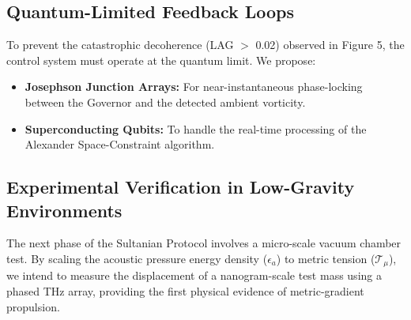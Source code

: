 \documentclass[11pt,a4paper]{article}
\begin{document}
\subsection{Quantum-Limited Feedback Loops}
To prevent the catastrophic decoherence (LAG $>$ 0.02) observed in Figure 5, the control system must operate at the quantum limit. We propose:
\begin{itemize}
    \item \textbf{Josephson Junction Arrays:} For near-instantaneous phase-locking between the Governor and the detected ambient vorticity.
    \item \textbf{Superconducting Qubits:} To handle the real-time processing of the Alexander Space-Constraint algorithm.
\end{itemize}

\subsection{Experimental Verification in Low-Gravity Environments}
The next phase of the Sultanian Protocol involves a micro-scale vacuum chamber test. By scaling the acoustic pressure energy density ($\epsilon_a$) to metric tension ($\mathcal{T}_\mu$), we intend to measure the displacement of a nanogram-scale test mass using a phased THz array, providing the first physical evidence of metric-gradient propulsion.
\end{document}
